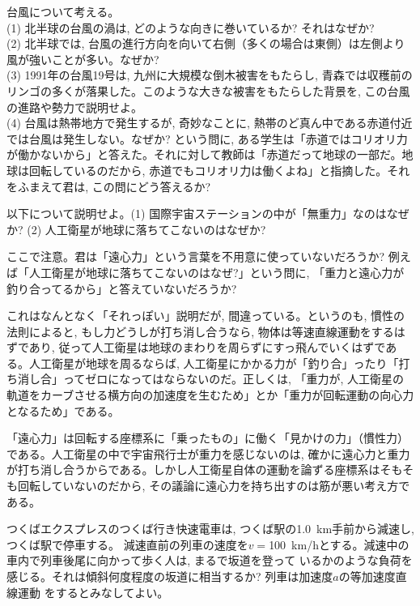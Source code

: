 \begin{q}\label{q:typhoon} 台風について考える。\\
(1) 北半球の台風の渦は, どのような向きに巻いているか? それはなぜか?\\
(2) 北半球では, 台風の進行方向を向いて右側（多くの場合は東側）は左側より風が強いことが多い。なぜか?\\
(3) 1991年の台風19号は, 九州に大規模な倒木被害をもたらし, 青森では収穫前のリンゴの多くが落果した。このような大きな被害をもたらした背景を, この台風の進路や勢力で説明せよ。\\
(4) 台風は熱帯地方で発生するが, 奇妙なことに, 熱帯のど真ん中である赤道付近では台風は発生しない。なぜか? という問に, ある学生は「赤道ではコリオリ力が働かないから」と答えた。それに対して教師は「赤道だって地球の一部だ。地球は回転しているのだから, 赤道でもコリオリ力は働くよね」と指摘した。それをふまえて君は, この問にどう答えるか?\\
\end{q}

\begin{q}\label{q:ISS_zerogravity} 以下について説明せよ。(1) 国際宇宙ステーションの中が「無重力」なのはなぜか? (2) 人工衛星が地球に落ちてこないのはなぜか?\end{q}

ここで注意。君は「遠心力」という言葉を不用意に使っていないだろうか? 例えば「人工衛星が地球に落ちてこないのはなぜ?」という問に, 「重力と遠心力が釣り合ってるから」と答えていないだろうか?

これはなんとなく「それっぽい」説明だが, 間違っている。というのも, 慣性の法則によると, もし力どうしが打ち消し合うなら, 物体は等速直線運動をするはずであり, 従って人工衛星は地球のまわりを周らずにすっ飛んでいくはずである。人工衛星が地球を周るならば, 人工衛星にかかる力が「釣り合」ったり「打ち消し合」ってゼロになってはならないのだ。正しくは, 「重力が, 人工衛星の軌道をカーブさせる横方向の加速度を生むため」とか「重力が回転運動の向心力となるため」である。

「遠心力」は回転する座標系に「乗ったもの」に働く「見かけの力」（慣性力）である。人工衛星の中で宇宙飛行士が重力を感じないのは, 確かに遠心力と重力が打ち消し合うからである。しかし人工衛星自体の運動を論ずる座標系はそもそも回転していないのだから, その議論に遠心力を持ち出すのは筋が悪い考え方である。\mv

\begin{exq} つくばエクスプレスのつくば行き快速電車は, つくば駅の1.0~km手前から減速し, つくば駅で停車する。
減速直前の列車の速度を$v=$100~km/hとする。減速中の車内で列車後尾に向かって歩く人は, まるで坂道を登って
いるかのような負荷を感じる。それは傾斜何度程度の坂道に相当するか? 列車は加速度$a$の等加速度直線運動
をするとみなしてよい。\end{exq}
\mv

